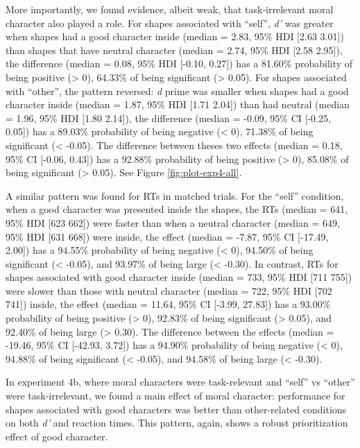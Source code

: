 \documentclass[
  man]{apa6}
\begin{document}
More importantly, we found evidence, albeit weak, that task-irrelevant moral character also played a role. For shapes associated with ``self'', \emph{d'} was greater when shapes had a good character inside (median = 2.83, 95\% HDI {[}2.63 3.01{]}) than shapes that have neutral character (median = 2.74, 95\% HDI {[}2.58 2.95{]}), the difference (median = 0.08, 95\% HDI {[}-0.10, 0.27{]}) has a 81.60\% probability of being positive (\textgreater{} 0), 64.33\% of being significant (\textgreater{} 0.05). For shapes associated with ``other'', the pattern reversed: \emph{d} prime was smaller when shapes had a good character inside (median = 1.87, 95\% HDI {[}1.71 2.04{]}) than had neutral (median = 1.96, 95\% HDI {[}1.80 2.14{]}), the difference (median = -0.09, 95\% CI {[}-0.25, 0.05{]}) has a 89.03\% probability of being negative (\textless{} 0), 71.38\% of being significant (\textless{} -0.05). The difference between theses two effects (median = 0.18, 95\% CI {[}-0.06, 0.43{]}) has a 92.88\% probability of being positive (\textgreater{} 0), 85.08\% of being significant (\textgreater{} 0.05). See Figure \ref{fig:plot-exp4-all}.

A similar pattern was found for RTs in matched trials. For the ``self'' condition, when a good character was presented inside the shapes, the RTs (median = 641, 95\% HDI {[}623 662{]}) were faster than when a neutral character (median = 649, 95\% HDI {[}631 668{]}) were inside, the effect (median = -7.87, 95\% CI {[}-17.49, 2.00{]}) has a 94.55\% probability of being negative (\textless{} 0), 94.50\% of being significant (\textless{} -0.05), and 93.97\% of being large (\textless{} -0.30). In contrast, RTs for shapes associated with good character inside (median = 733, 95\% HDI {[}711 755{]}) were slower than those with neutral character (median = 722, 95\% HDI {[}702 741{]}) inside, the effect (median = 11.64, 95\% CI {[}-3.99, 27.83{]}) has a 93.00\% probability of being positive (\textgreater{} 0), 92.83\% of being significant (\textgreater{} 0.05), and 92.40\% of being large (\textgreater{} 0.30). The difference between the effects (median = -19.46, 95\% CI {[}-42.93, 3.72{]}) has a 94.90\% probability of being negative (\textless{} 0), 94.88\% of being significant (\textless{} -0.05), and 94.58\% of being large (\textless{} -0.30).

In experiment 4b, where moral characters were task-relevant and ``self'' vs ``other'' were task-irrelevant, we found a main effect of moral character: performance for shapes associated with good characters was better than other-related conditions on both \emph{d'} and reaction times. This pattern, again, shows a robust prioritization effect of good character.
\end{document}
